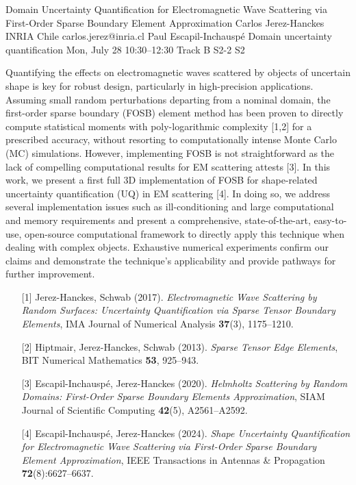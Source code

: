 \begin{talk}
  {Domain Uncertainty Quantification for Electromagnetic Wave Scattering via First-Order Sparse Boundary Element Approximation}%
  {Carlos Jerez-Hanckes}%
  {INRIA Chile}%
  {carlos.jerez@inria.cl}%
  {Paul Escapil-Inchausp\'e}%
  {Domain uncertainty quantification}%
  {Mon, July 28 10:30–12:30 Track B}%
  {S2-2}%
  {S2}%
				
			
Quantifying the effects on electromagnetic waves scattered by objects of uncertain shape is key for robust design, particularly in high-precision applications. Assuming small random perturbations departing from a nominal domain, the first-order sparse boundary (FOSB) element method has been proven to directly compute statistical moments with poly-logarithmic complexity [1,2] for a prescribed accuracy, without resorting to computationally intense Monte Carlo (MC) simulations. However, implementing FOSB is not straightforward as the lack of compelling computational results for EM scattering attests [3]. In this work, we present a first full 3D implementation of FOSB for shape-related uncertainty quantification (UQ) in EM scattering [4]. In doing so, we address several implementation issues such as ill-conditioning and large computational and memory requirements and present a comprehensive, state-of-the-art, easy-to-use, open-source computational framework to directly apply this technique when dealing with complex objects. Exhaustive numerical experiments confirm our claims and demonstrate the technique's applicability and provide pathways for further improvement.

\medskip

\begin{enumerate}
	\item[{[1]}] Jerez-Hanckes, Schwab (2017). {\it Electromagnetic Wave Scattering by Random Surfaces: Uncertainty Quantification via Sparse Tensor Boundary Elements}, IMA Journal of Numerical Analysis {\bf 37}(3), 1175--1210.
	\item[{[2]}] Hiptmair, Jerez-Hanckes, Schwab (2013). {\it Sparse Tensor Edge Elements}, BIT Numerical Mathematics {\bf 53}, 925--943.
	\item[{[3]}] Escapil-Inchausp\'e, Jerez-Hanckes (2020). {\it Helmholtz Scattering by Random Domains: First-Order Sparse Boundary Elements Approximation}, SIAM Journal of Scientific Computing {\bf 42}(5), A2561--A2592.
	\item[{[4]}] Escapil-Inchausp\'e, Jerez-Hanckes (2024). {\it Shape Uncertainty Quantification for Electromagnetic Wave Scattering via First-Order Sparse Boundary Element Approximation}, IEEE Transactions in Antennas \& Propagation {\bf 72}(8):6627--6637.
\end{enumerate}


\end{talk}

